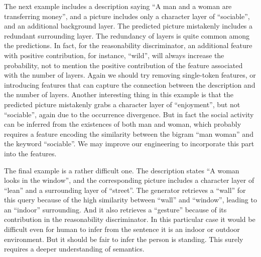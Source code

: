 \documentclass{article} %
\begin{document}
The next example includes a description saying ``A man and a woman are transferring money'', and a picture includes only a character layer of ``sociable'', and an additional background layer. The predicted picture mistakenly includes a redundant surrounding layer. The redundancy of layers is quite common among the predictions. In fact, for the reasonability discriminator, an additional feature with positive contribution, for instance, ``wild'', will always increase the probability, not to mention the positive contribution of the feature associated with the number of layers. Again we should try removing single-token features, or introducing features that can capture the connection between the description and the number of layers. 
Another interesting thing in this example is that the predicted picture mistakenly grabs a character layer of ``enjoyment'', but not ``sociable'', again due to the occurrence divergence. But in fact the social activity can be inferred from the existences of both man and woman, which probably requires a feature encoding the similarity between the bigram ``man woman'' and the keyword ``sociable''. We may improve our engineering to incorporate this part into the features.

The final example is a rather difficult one. The description states ``A woman looks in the window'', and the corresponding picture includes a character layer of ``lean'' and a surrounding layer of ``street''. The generator retrieves a ``wall'' for this query because of the high similarity between ``wall'' and ``window'', leading to an ``indoor'' surrounding. And it also retrieves a ``gesture'' because of its contribution in the reasonability discriminator. In this particular case it would be difficult even for human to infer from the sentence it is an indoor or outdoor environment. But it should be fair to infer the person is standing. This surely requires a deeper understanding of semantics.

\end{document}
